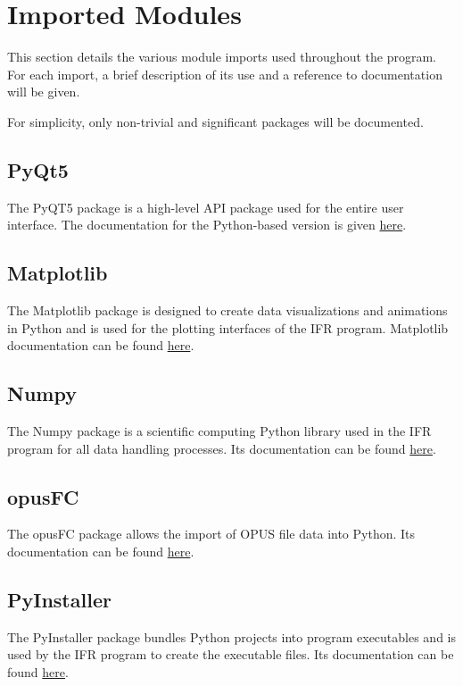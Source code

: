 \documentclass[a4paper, 12pt]{report}
\begin{document}
    \section{Imported Modules}
    
    This section details the various module imports used throughout the program. For each import, a brief description of its use and a reference to documentation will be given.
    
    For simplicity, only non-trivial and significant packages will be documented.
    
    \subsection{PyQt5}
    
    The PyQT5 package is a high-level API package used for the entire user interface. The documentation for the Python-based version is given \href{https://doc.bccnsoft.com/docs/PyQt5/}{here}.
    
    \subsection{Matplotlib}
    
    The Matplotlib package is designed to create data visualizations and animations in Python and is used for the plotting interfaces of the IFR program. Matplotlib documentation can be found \href{https://matplotlib.org/3.2.2/index.html}{here}.
    
    \subsection{Numpy}
    
    The Numpy package is a scientific computing Python library used in the IFR program for all data handling processes. Its documentation can be found \href{https://numpy.org/doc/stable/}{here}.
    
    \subsection{opusFC}
    
    The opusFC package allows the import of OPUS file data into Python. Its documentation can be found \href{https://stuart-cls.github.io/python-opusfc-dist/}{here}.
    
    \subsection{PyInstaller}
    
    The PyInstaller package bundles Python projects into program executables and is used by the IFR program to create the executable files. Its documentation can be found \href{https://pyinstaller.readthedocs.io/en/stable/usage.html}{here}.
\end{document}
